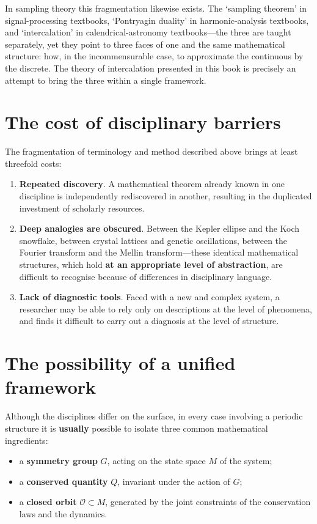 In sampling theory this fragmentation likewise exists. The `sampling theorem' in signal-processing textbooks, `Pontryagin duality' in harmonic-analysis textbooks, and `intercalation' in calendrical-astronomy textbooks---the three are taught separately, yet they point to three faces of one and the same mathematical structure: how, in the incommensurable case, to approximate the continuous by the discrete. The theory of intercalation presented in this book is precisely an attempt to bring the three within a single framework.

\section*{The cost of disciplinary barriers}

The fragmentation of terminology and method described above brings at least threefold costs:

\begin{enumerate}[leftmargin=2em, label={(\arabic*)}]
    \item \textbf{Repeated discovery}. A mathematical theorem already known in one discipline is independently rediscovered in another, resulting in the duplicated investment of scholarly resources.
    \item \textbf{Deep analogies are obscured}. Between the Kepler ellipse and the Koch snowflake, between crystal lattices and genetic oscillations, between the Fourier transform and the Mellin transform---these identical mathematical structures, which hold \textbf{at an appropriate level of abstraction}, are difficult to recognise because of differences in disciplinary language.
    \item \textbf{Lack of diagnostic tools}. Faced with a new and complex system, a researcher may be able to rely only on descriptions at the level of phenomena, and finds it difficult to carry out a diagnosis at the level of structure.
\end{enumerate}

\section*{The possibility of a unified framework}

Although the disciplines differ on the surface, in every case involving a periodic structure it is \textbf{usually} possible to isolate three common mathematical ingredients:

\begin{itemize}[leftmargin=2em]
    \item a \textbf{symmetry group} $G$, acting on the state space $M$ of the system;
    \item a \textbf{conserved quantity} $Q$, invariant under the action of $G$;
    \item a \textbf{closed orbit} $\mathcal{O} \subset M$, generated by the joint constraints of the conservation laws and the dynamics.
\end{itemize}

